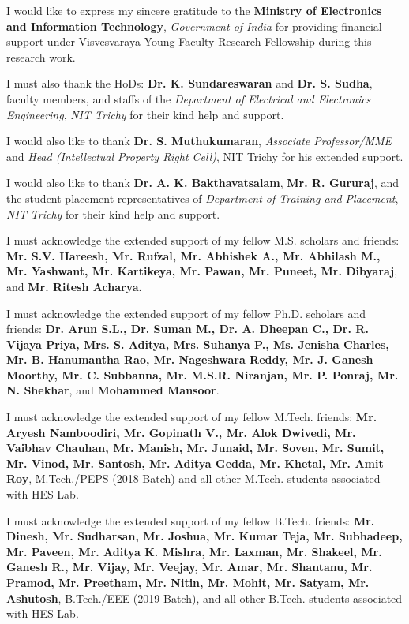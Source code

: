 I would like to express my sincere gratitude to the \textbf{Ministry of Electronics and Information Technology}, \textit{Government of India} for providing financial support under Visvesvaraya Young Faculty Research Fellowship during this research work.

I must also thank the HoDs: \textbf{Dr. K. Sundareswaran} and \textbf{Dr. S. Sudha}, faculty members, and staffs of the \textit{Department of Electrical and Electronics Engineering}, \textit{NIT Trichy} for their kind help and support.

I would also like to thank \textbf{Dr. S. Muthukumaran}, \textit{Associate Professor/MME} and \textit{Head (Intellectual Property Right Cell)}, NIT Trichy for his extended support.

I would also like to thank \textbf{Dr. A. K. Bakthavatsalam}, \textbf{Mr. R. Gururaj}, and the student placement representatives of \textit{Department of Training and Placement}, \textit{NIT Trichy} for their kind help and support.

I must acknowledge the extended support of my fellow M.S. scholars and friends: \textbf{Mr. S.V. Hareesh, Mr. Rufzal, Mr. Abhishek A., Mr. Abhilash M., Mr. Yashwant, Mr. Kartikeya, Mr. Pawan, Mr. Puneet, Mr. Dibyaraj}, and \textbf{Mr. Ritesh Acharya.}

I must acknowledge the extended support of my fellow Ph.D. scholars and friends: \textbf{Dr. Arun S.L., Dr. Suman M., Dr. A. Dheepan C., Dr. R. Vijaya Priya, Mrs. S. Aditya, Mrs. Suhanya P., Ms. Jenisha Charles, Mr. B. Hanumantha Rao, Mr. Nageshwara Reddy, Mr. J. Ganesh Moorthy, Mr. C. Subbanna, Mr. M.S.R. Niranjan, Mr. P. Ponraj, Mr. N. Shekhar}, and \textbf{Mohammed Mansoor}.

I must acknowledge the extended support of my fellow M.Tech. friends: \textbf{Mr. Aryesh Namboodiri, Mr. Gopinath V., Mr. Alok Dwivedi, Mr. Vaibhav Chauhan, Mr. Manish, Mr. Junaid, Mr. Soven, Mr. Sumit, Mr. Vinod, Mr. Santosh, Mr. Aditya Gedda, Mr. Khetal, Mr. Amit Roy}, M.Tech./PEPS (2018 Batch) and all other M.Tech. students associated with HES Lab.   

I must acknowledge the extended support of my fellow B.Tech. friends: \textbf{Mr. Dinesh, Mr. Sudharsan, Mr. Joshua, Mr. Kumar Teja, Mr. Subhadeep, Mr. Paveen, Mr. Aditya K. Mishra, Mr. Laxman, Mr. Shakeel, Mr. Ganesh R., Mr. Vijay, Mr. Veejay, Mr. Amar, Mr. Shantanu, Mr. Pramod, Mr. Preetham, Mr. Nitin, Mr. Mohit, Mr. Satyam, Mr. Ashutosh}, B.Tech./EEE (2019 Batch), and all other B.Tech. students associated with HES Lab.

